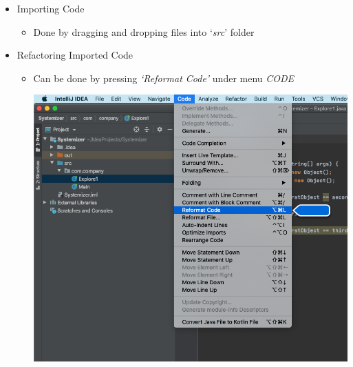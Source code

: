 \documentclass[12pt]{article}
\begin{document}
\begin{itemize}
    \item Importing Code
    \begin{itemize}
        \item Done by dragging and dropping files into `\textit{src}' folder
    \end{itemize}

    \item Refactoring Imported Code
    \begin{itemize}
        \item Can be done by pressing \textit{`Reformat Code'} under menu \textit{CODE}

        \begin{center}
        \includegraphics[width=\linewidth]{images/part_2_notes_5.png}
        \end{center}
    \end{itemize}
\end{itemize}
\end{document}
